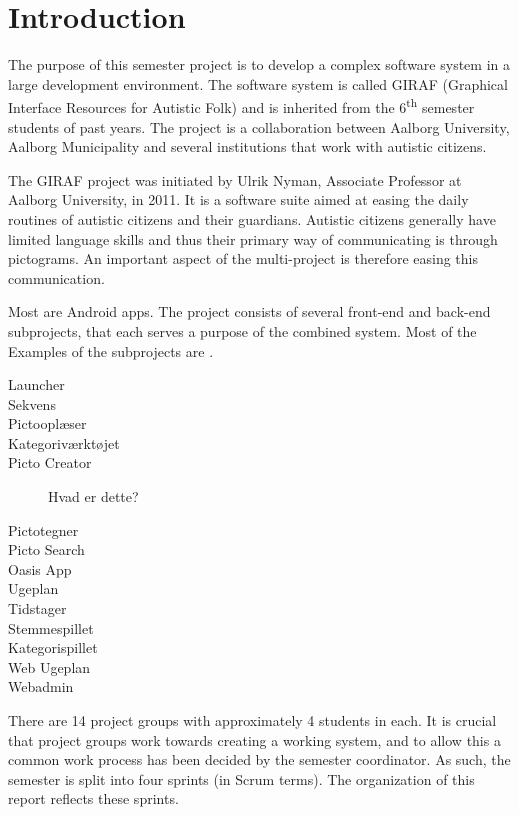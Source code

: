 \chapter{Introduction}

The purpose of this semester project is to develop a complex software system in a large development environment. The software system is called GIRAF (Graphical Interface Resources for Autistic Folk) and is inherited from the 6\textsuperscript{th} semester students of past years. The project is a collaboration between Aalborg University, Aalborg Municipality and several institutions that work with autistic citizens. 

The GIRAF project was initiated by Ulrik Nyman, Associate Professor at Aalborg University, in 2011. It is a software suite aimed at easing the daily routines of autistic citizens and their guardians. Autistic citizens generally have limited language skills and thus their primary way of communicating is through pictograms. An important aspect of the multi-project is therefore easing this communication.

Most are Android apps.
The project consists of several front-end and back-end subprojects, that each serves a purpose of the combined system. Most of the Examples of the subprojects are .

\begin{description}
  \item[Launcher] \dummy
  \item[Sekvens]
  \item[Pictooplæser]
	\item[Kategoriværktøjet] \dummy
  \item[Picto Creator] Hvad er dette?
  \item[Pictotegner]
  \item[Picto Search] \dummy
  \item[Oasis App]
  \item[Ugeplan]
  \item[Tidstager] 
  \item[Stemmespillet]
  \item[Kategorispillet]
  \item[Web Ugeplan]
  \item[Webadmin]
\end{description}

There are 14 project groups with approximately 4 students in each. It is crucial that project groups work towards creating a working system, and to allow this a common work process has been decided by the semester coordinator. As such, the semester is split into four sprints (in Scrum terms). The organization of this report reflects these sprints. 

